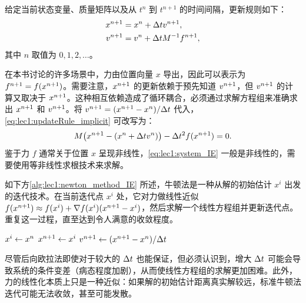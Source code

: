 \begin{method}[牛顿第二定律的后向欧拉时间积分]
  \label{met:lec1:backward_euler}
  给定当前状态变量、质量矩阵以及从 $t^n$ 到 $t^{n+1}$ 的时间间隔，更新规则如下：
  \begin{equation}
    \label{eq:lec1:updateRule_implicit}
    \begin{aligned}
      x^{n+1} &= x^{n} + \Delta t v^{n+1}, \\
      v^{n+1} &= v^{n} + \Delta t M^{-1} f^{n+1},
    \end{aligned}
  \end{equation}
  其中 $n$ 取值为 $0, 1, 2, \dots$。
\end{method}

在本书讨论的许多场景中，力由位置向量 $x$ 导出，因此可以表示为 $f^{n+1} = f(x^{n+1})$。需要注意，$x^{n+1}$ 的更新依赖于预先知道 $v^{n+1}$，但 $v^{n+1}$ 的计算又取决于 $x^{n+1}$。这种相互依赖造成了循环耦合，必须通过求解方程组来准确求出 $x^{n+1}$ 和 $v^{n+1}$。将 $v^{n+1} = (x^{n+1} - x^{n})/\Delta t$ 代入，\cref{eq:lec1:updateRule_implicit} 可改写为：
\begin{equation}
  \label{eq:lec1:system_IE}
  M\bigl(x^{n+1} - (x^{n} + \Delta t v^{n})\bigr) - \Delta t^2 f(x^{n+1}) = 0.
\end{equation}
鉴于力 $f$ 通常关于位置 $x$ 呈现非线性，\cref{eq:lec1:system_IE} 一般是非线性的，需要使用等非线性求根技术来求解。

\begin{method}[用于后向欧拉时间积分的牛顿法]
  \label{met:lec1:newton_backward_euler}
  如下方\cref{alg:lec1:newton_method_IE} 所述，牛顿法是一种从解的初始估计 $x^i$ 出发的迭代技术。在当前迭代点 $x^i$ 处，它对力做线性近似 $f(x^{n+1}) \approx f(x^i) + \nabla f(x^i)(x^{n+1} - x^i)$，然后求解一个线性方程组并更新迭代点。重复这一过程，直至达到令人满意的收敛程度。

  \vspace{0.5em}
  \begin{algorithm}[H]
    \caption{用于后向欧拉时间积分的牛顿法}
    \label{alg:lec1:newton_method_IE}
    \KwResult{$\xnp,\ \velnp$}
    $x^i \leftarrow x^{n}$\;
    $x^{n+1} \leftarrow x^i$\;
    $v^{n+1} \leftarrow (x^{n+1} - x^{n})/\Delta t$\;
  \end{algorithm}
\end{method}

尽管后向欧拉法即使对于较大的 $\Delta t$ 也能保证，但必须认识到，增大 $\Delta t$ 可能会导致系统的条件变差（病态程度加剧），从而使线性方程组的求解更加困难。此外，力的线性化本质上只是一种近似：如果解的初始估计距离真实解较远，标准牛顿法迭代可能无法收敛，甚至可能发散。


